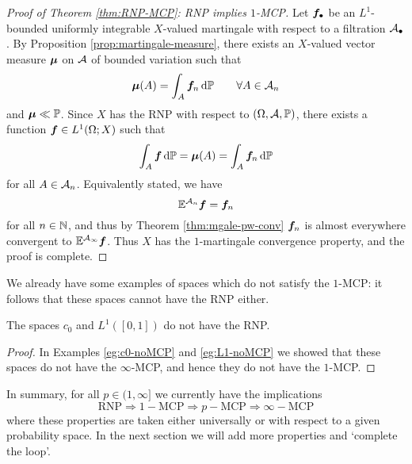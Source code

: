 \begin{proof}[Proof of Theorem \ref{thm:RNP-MCP}: RNP implies $1$-MCP]
  Let $\bm{f}_{\bullet}$ be an $L^1$-bounded uniformly integrable $X$-valued martingale with respect to a filtration $\mathcal{A}_{\bullet}$.
  By Proposition \ref{prop:martingale-measure}, there exists an $X$-valued vector measure $\bm{\mu}$ on $\mathcal{A}$ of bounded variation such that
  \begin{equation*}
    \bm{\mu}(A) = \int_{A} \bm{f}_n \, \mathrm{d}\mathbb{P} \qquad \forall A \in \mathcal{A}_n
  \end{equation*}
  and $\bm{\mu} \ll \mathbb{P}$.
  Since $X$ has the RNP with respect to $(\Omega,\mathcal{A},\mathbb{P})$, there exists a function $\bm{f} \in L^1(\Omega;X)$ such that
  \begin{equation*}
    \int_{A} \bm{f} \, \mathrm{d}\mathbb{P} = \bm{\mu}(A) = \int_A \bm{f}_n \, \mathrm{d}\mathbb{P}
  \end{equation*}
  for all $A \in \mathcal{A}_n$.
  Equivalently stated, we have
  \begin{equation*}
    \mathbb{E}^{\mathcal{A}_n} \bm{f} = \bm{f}_n
  \end{equation*}
  for all $n \in \mathbb{N}$, and thus by Theorem \ref{thm:mgale-pw-conv} $\bm{f}_n$ is almost everywhere convergent to $\mathbb{E}^{\mathcal{A}_{\infty}}\bm{f}$.
  Thus $X$ has the $1$-martingale convergence property, and the proof is complete.
\end{proof}

We already have some examples of spaces which do not satisfy the $1$-MCP: it follows that these spaces cannot have the RNP either.

\begin{cor}
  The spaces $c_0$ and $L^1([0,1])$ do not have the RNP.
\end{cor}

\begin{proof}
  In Examples \ref{eg:c0-noMCP} and \ref{eg:L1-noMCP} we showed that these spaces do not have the $\infty$-MCP, and hence they do not have the $1$-MCP. 
\end{proof} 

In summary, for all $p \in (1,\infty]$ we currently have the implications
\begin{equation*}
  \mathrm{RNP} \Longrightarrow 1-\mathrm{MCP} \Longrightarrow p-\mathrm{MCP} \Longrightarrow \infty-\mathrm{MCP}
\end{equation*}
where these properties are taken either universally or with respect to a given probability space.
In the next section we will add more properties and `complete the loop'.

